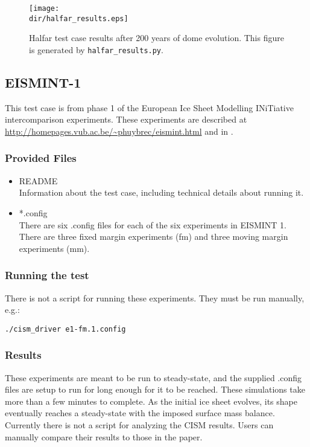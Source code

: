 \begin{figure}[H]
	\centering
	\texttt{[image: \\dir/halfar\_results.eps]}
	\caption{Halfar test case results after 200 years of dome evolution. This figure is generated by \texttt{halfar\_results.py}.}
	\label{fig:halfarresults}
\end{figure}


\FloatBarrier


\subsection{EISMINT-1}
\label{sec:eismint_description}
This test case is from phase 1 of the European Ice Sheet Modelling INiTiative intercomparison experiments.  These experiments are described at \url{http://homepages.vub.ac.be/~phuybrec/eismint.html} and in \citet{Huybrechts1996}.

\subsubsection{Provided Files}
\label{subsec:eismint_files}

\begin{itemize}
	\item README \\
		Information about the test case, including technical details about running it.
\item *.config \\
  There are six .config files for each of the six experiments in EISMINT 1.  There are three fixed margin experiments (fm) and three moving margin experiments (mm).
\end{itemize}

\subsubsection{Running the test}
There is not a script for running these experiments.  They must be run manually, e.g.: 

\texttt{./cism\_driver e1-fm.1.config}


\subsubsection{Results}
\label{subsecc:eismint_results}
These experiments are meant to be run to steady-state, and the supplied .config files are setup to run for long enough for it to be reached.
These simulations take more than a few minutes to complete.
As the initial ice sheet evolves, its shape eventually reaches a steady-state with the imposed surface mass balance.  Currently there is not a script for analyzing the CISM results.  Users can manually compare their results to those in the \citet{Huybrechts1996} paper.


